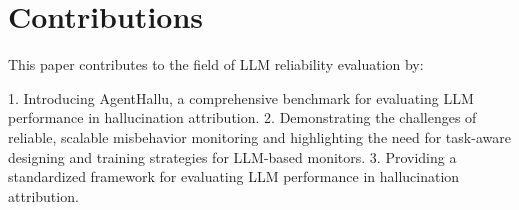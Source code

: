 \documentclass{article}
\begin{document}
\section{Contributions}

This paper contributes to the field of LLM reliability evaluation by:

1. Introducing AgentHallu, a comprehensive benchmark for evaluating LLM performance in hallucination attribution.
2. Demonstrating the challenges of reliable, scalable misbehavior monitoring and highlighting the need for task-aware designing and training strategies for LLM-based monitors.
3. Providing a standardized framework for evaluating LLM performance in hallucination attribution.



\end{document}
